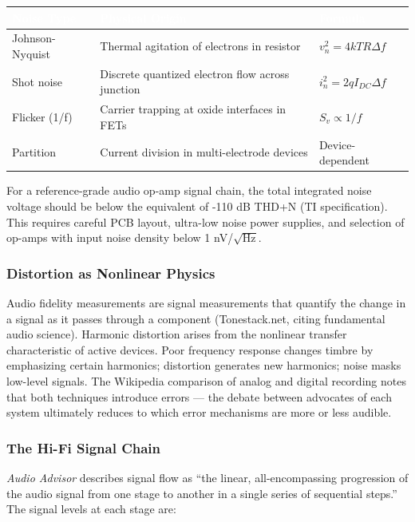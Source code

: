 \documentclass[11pt,letterpaper]{article}
\newcommand{\tableheader}[1]{\textbf{\sffamily\textcolor{white}{#1}}}
\begin{document}
\begin{center}
\begin{tabularx}{\textwidth}{L{3cm}XL{3.5cm}}
\toprule
{}
\tableheader{Noise Type} & \tableheader{Physical Origin} & \tableheader{Formula} \\
\midrule
Johnson-Nyquist & Thermal agitation of electrons in resistor & $v_n^2 = 4kTR\Delta f$ \\
Shot noise & Discrete quantized electron flow across junction & $i_n^2 = 2qI_{DC}\Delta f$ \\
Flicker (1/f) & Carrier trapping at oxide interfaces in FETs & $S_v \propto 1/f$ \\
Partition & Current division in multi-electrode devices & Device-dependent \\
\bottomrule
\end{tabularx}
\end{center}

For a reference-grade audio op-amp signal chain, the total integrated noise voltage should be below the equivalent of -110 dB THD+N (TI specification). This requires careful PCB layout, ultra-low noise power supplies, and selection of op-amps with input noise density below 1 nV/$\sqrt{\text{Hz}}$.

\subsubsection{Distortion as Nonlinear Physics}

Audio fidelity measurements are signal measurements that quantify the change in a signal as it passes through a component (Tonestack.net, citing fundamental audio science). Harmonic distortion arises from the nonlinear transfer characteristic of active devices. Poor frequency response changes timbre by emphasizing certain harmonics; distortion generates new harmonics; noise masks low-level signals. The Wikipedia comparison of analog and digital recording notes that both techniques introduce errors --- the debate between advocates of each system ultimately reduces to which error mechanisms are more or less audible.

\subsubsection{The Hi-Fi Signal Chain}

\textit{Audio Advisor} describes signal flow as ``the linear, all-encompassing progression of the audio signal from one stage to another in a single series of sequential steps.'' The signal levels at each stage are:
\end{document}
